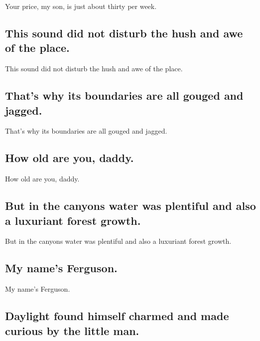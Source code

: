 \documentclass[]{article}
\begin{document}
Your price, my son, is just about thirty per week.

\hypertarget{this-sound-did-not-disturb-the-hush-and-awe-of-the-place.}{%
\subsection{This sound did not disturb the hush and awe of the
place.}\label{this-sound-did-not-disturb-the-hush-and-awe-of-the-place.}}

This sound did not disturb the hush and awe of the place.

\hypertarget{thats-why-its-boundaries-are-all-gouged-and-jagged.}{%
\subsection{That's why its boundaries are all gouged and
jagged.}\label{thats-why-its-boundaries-are-all-gouged-and-jagged.}}

That's why its boundaries are all gouged and jagged.

\hypertarget{how-old-are-you-daddy.}{%
\subsection{How old are you, daddy.}\label{how-old-are-you-daddy.}}

How old are you, daddy.

\hypertarget{but-in-the-canyons-water-was-plentiful-and-also-a-luxuriant-forest-growth.}{%
\subsection{But in the canyons water was plentiful and also a luxuriant
forest
growth.}\label{but-in-the-canyons-water-was-plentiful-and-also-a-luxuriant-forest-growth.}}

But in the canyons water was plentiful and also a luxuriant forest
growth.

\hypertarget{my-names-ferguson.}{%
\subsection{My name's Ferguson.}\label{my-names-ferguson.}}

My name's Ferguson.

\hypertarget{daylight-found-himself-charmed-and-made-curious-by-the-little-man.}{%
\subsection{Daylight found himself charmed and made curious by the
little
man.}\label{daylight-found-himself-charmed-and-made-curious-by-the-little-man.}}
\end{document}
